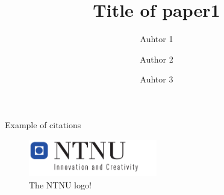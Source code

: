 \documentclass{standalone}
\begin{document}
\author{
  Auhtor 1
  \and
  Author 2
  \and
  Auhtor 3}
\title{Title of paper1}

\maketitle

\label{pap:paper1}
\begin{abstract}
\lipsum[6-7]
\end{abstract}

\lipsum[6-7]



Example of citations
\cite{Mathisen2019,schank1983dynamic}


\begin{figure}[h]
\centering
\includegraphics[width=0.5\textwidth]{figures/paper1/NTNUlogo.pdf} %
\caption{The NTNU logo!}
\end{figure}


\printbibliography[segment=\therefsegment,heading=subbibliography]
\end{document}
